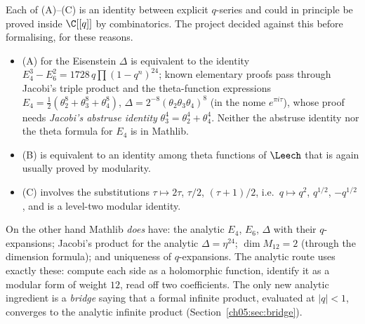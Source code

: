 Each of (A)--(C) is an identity between explicit $q$-series and could in principle be proved
inside $\C[[q]]$ by combinatorics. The project decided against this before formalising, for these
reasons.
\begin{itemize}
  \item (A) for the Eisenstein $\Delta$ is equivalent to the identity $E_4^3 - E_6^2 =
    1728\,q\prod(1-q^n)^{24}$; known elementary proofs pass through Jacobi's triple product and the
    theta-function expressions $E_4 = \tfrac12(\theta_2^8+\theta_3^8+\theta_4^8)$, $\Delta =
    2^{-8}(\theta_2\theta_3\theta_4)^8$ (in the nome $e^{\pi i\tau}$), whose proof needs \emph{Jacobi's
    abstruse identity} $\theta_3^4 = \theta_2^4 + \theta_4^4$. Neither the abstruse identity nor the
    theta formula for $E_4$ is in Mathlib.
  \item (B) is equivalent to an identity among theta functions of $\Leech$ that is again usually
    proved by modularity.
  \item (C) involves the substitutions $\tau\mapsto2\tau$, $\tau/2$, $(\tau+1)/2$, i.e.\ $q\mapsto q^2$, $q^{1/2}$,
    $-q^{1/2}$, and is a level-two modular identity.
\end{itemize}
On the other hand Mathlib \emph{does} have: the analytic $E_4$, $E_6$, $\Delta$ with their
$q$-expansions; Jacobi's product for the analytic $\Delta = \eta^{24}$; $\dim M_{12} = 2$ (through the
dimension formula); and uniqueness of $q$-expansions. The analytic route uses exactly these: compute
each side as a holomorphic function, identify it as a modular form of weight $12$, read off two
coefficients. The only new analytic ingredient is a \emph{bridge} saying that a formal infinite
product, evaluated at $|q|<1$, converges to the analytic infinite product
(Section~\ref{ch05:sec:bridge}).

